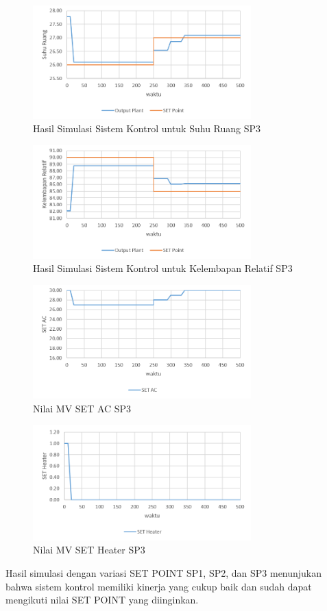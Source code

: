 \begin{figure}[!h]
	\centering
	\includegraphics[width=0.75\textwidth]{figures/SimulinkSP3Td}
	\caption{Hasil Simulasi Sistem Kontrol untuk Suhu Ruang SP3}
	\label{fig:5:SimulinkSP3Td}
\end{figure}

\begin{figure}[!h]
	\centering
	\includegraphics[width=0.75\textwidth]{figures/SimulinkSP3RH}
	\caption{Hasil Simulasi Sistem Kontrol untuk Kelembapan Relatif SP3}
	\label{fig:5:SimulinkSP3RH}
\end{figure}

\begin{figure}[!h]
	\centering
	\includegraphics[width=0.75\textwidth]{figures/SimulinkSP3AC}
	\caption{Nilai MV SET AC SP3}
	\label{fig:5:SimulinkSP3AC}
\end{figure}

\begin{figure}[!h]
	\centering
	\includegraphics[width=0.75\textwidth]{figures/SimulinkSP3HT}
	\caption{Nilai MV SET Heater SP3}
	\label{fig:5:SimulinkSP3HT}
\end{figure}

Hasil simulasi dengan variasi SET POINT SP1, SP2, dan SP3 menunjukan bahwa sistem kontrol memiliki kinerja yang cukup baik dan sudah dapat mengikuti nilai SET POINT yang diinginkan.